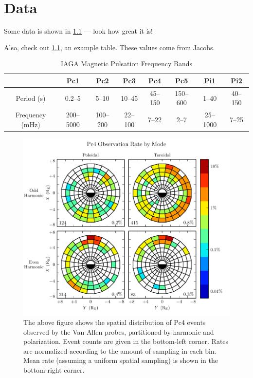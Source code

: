 
\chapter{Data}
  \label{ch_data}

Some data is shown in \cref{fig_mode_all_sharp} --- look how great it is! 

Also, check out \cref{tab_iaga}, an example table. These values come from
Jacobs\cite{jacobs_1964}. 

\begin{longtable}{cccccccc}
  \caption[IAGA Magnetic Pulsation Frequency Bands]
    {IAGA Magnetic Pulsation Frequency Bands}
  \label{tab_iaga} \\
  \toprule
  & Pc1 & Pc2 & Pc3 & Pc4 & Pc5 & Pi1 & Pi2 \\
  \midrule
  \endfirsthead
  \bottomrule
  \endlastfoot
  Period (\si{\second}) & 0.2--5    & 5--10    & 10--45  & 45--150 & 150--600 &
    1--40    & 40--150 \\
  Frequency (\si{\mHz}) & 200--5000 & 100--200 & 22--100 & 7--22   & 2--7     &
    25--1000 & 7--25 \\
\end{longtable}

\begin{figure}[!htb]
  \centering
  \includegraphics[width=\textwidth]{figures/mode_all_sharp.pdf}
  \caption[Observation Rate of Pc4 Events by Mode]{
    The above figure shows the spatial distribution of Pc4 events observed by
    the Van Allen probes, partitioned by harmonic and polarization. Event
    counts are given in the bottom-left corner. Rates are normalized according
    to the amount of sampling in each bin. Mean rate (assuming a uniform
    spatial sampling) is shown in the bottom-right corner. 
  }
  \label{fig_mode_all_sharp}
\end{figure}
